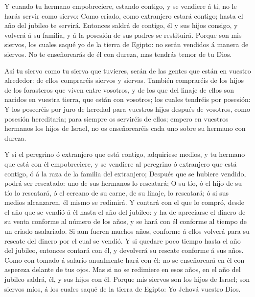  Y cuando tu hermano empobreciere, estando contigo, y se
vendiere á ti, no le harás servir como siervo:  Como
criado, como extranjero estará contigo; hasta el año del jubileo te
servirá.  Entonces saldrá de contigo, él y sus hijos
consigo, y volverá á su familia, y á la posesión de sus padres se
restituirá.  Porque son mis siervos, los cuales saqué yo de
la tierra de Egipto: no serán vendidos á manera de siervos.
 No te enseñorearás de él con dureza, mas tendrás temor de
tu Dios.

 Así tu siervo como tu sierva que tuvieres, serán de las
gentes que están en vuestro alrededor: de ellos compraréis siervos y
siervas.  También compraréis de los hijos de los forasteros
que viven entre vosotros, y de los que del linaje de ellos son nacidos
en vuestra tierra, que están con vosotros; los cuales tendréis por
posesión:  Y los poseeréis por juro de heredad para
vuestros hijos después de vosotros, como posesión hereditaria; para
siempre os serviréis de ellos; empero en vuestros hermanos los hijos de
Israel, no os enseñorearéis cada uno sobre su hermano con dureza.

 Y si el peregrino ó extranjero que está contigo,
adquiriese medios, y tu hermano que está con él empobreciere, y se
vendiere al peregrino ó extranjero que está contigo, ó á la raza de la
familia del extranjero;  Después que se hubiere vendido,
podrá ser rescatado: uno de sus hermanos lo rescatará;  O
su tío, ó el hijo de su tío lo rescatará, ó el cercano de su carne, de
su linaje, lo rescatará; ó si sus medios alcanzaren, él mismo se
redimirá.  Y contará con el que lo compró, desde el año que
se vendió á él hasta el año del jubileo: y ha de apreciarse el dinero de
su venta conforme al número de los años, y se hará con él conforme al
tiempo de un criado asalariado.  Si aun fueren muchos años,
conforme á ellos volverá para su rescate del dinero por el cual se
vendió.  Y si quedare poco tiempo hasta el año del jubileo,
entonces contará con él, y devolverá su rescate conforme á sus años.
 Como con tomado á salario anualmente hará con él: no se
enseñoreará en él con aspereza delante de tus ojos.  Mas si
no se redimiere en esos años, en el año del jubileo saldrá, él, y sus
hijos con él.  Porque mis siervos son los hijos de Israel;
son siervos míos, á los cuales saqué de la tierra de Egipto: Yo Jehová
vuestro Dios.

